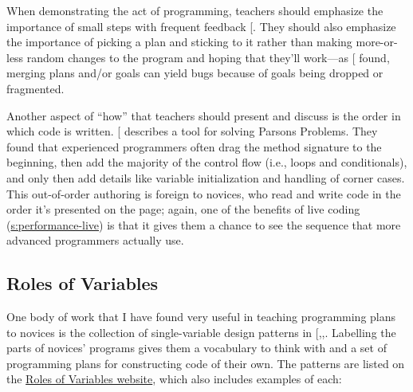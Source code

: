 When demonstrating the act of programming, teachers should emphasize the
importance of small steps with frequent feedback {[}\protect[\hyperlink{b:Blik2014}{Blik2014}]{]}.
They should also emphasize the importance of picking a plan and sticking
to it rather than making more-or-less random changes to the program and
hoping that they'll work---as {[}\protect[\hyperlink{b:Spoh1985}{Spoh1985}]{]} found, merging plans
and/or goals can yield bugs because of goals being dropped or
fragmented.

Another aspect of ``how'' that teachers should present and discuss is the
order in which code is written. {[}\protect[\hyperlink{b:Ihan2011}{Ihan2011}]{]} describes a tool for
solving Parsons Problems. They found that experienced programmers often
drag the method signature to the beginning, then add the majority of the
control flow (i.e., loops and conditionals), and only then add details
like variable initialization and handling of corner cases. This
out-of-order authoring is foreign to novices, who read and write code in
the order it's presented on the page; again, one of the benefits of live
coding (\protect\hyperlink{SECTION}{s:performance-live}) is that it gives them a chance
to see the sequence that more advanced programmers actually use.

\subsection{Roles of Variables}\label{roles-of-variables}

One body of work that I have found very useful in teaching programming
plans to novices is the collection of single-variable design patterns
in {[},,\protect[\hyperlink{b:Saja2006}{Saja2006}]{]}. Labelling
the parts of novices' programs gives them a vocabulary to think with
and a set of programming plans for constructing code of their own. The
patterns are listed on the \href{http://saja.kapsi.fi/var_roles/}{Roles of Variables
website}, which also includes examples of each:

